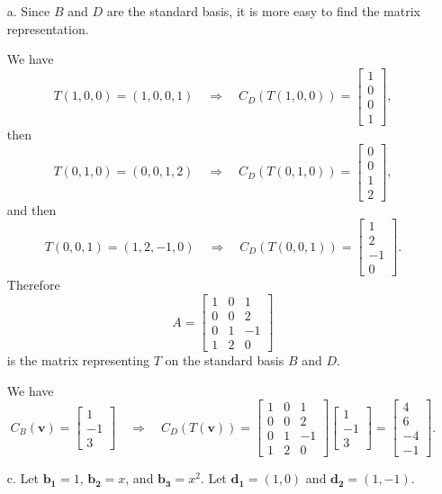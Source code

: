 \documentclass[12pt]{article}
\newcommand{\Ra}{\Rightarrow}
\begin{document}
	\begin{enumerate}
		\item[a.] Since $B$ and $D$ are the standard basis, it is more easy to find the matrix representation. 

		We have
			\[
				T (1, 0, 0) = (1, 0, 0, 1) \quad \Ra \quad C_D (T (1, 0, 0)) = \begin{bmatrix} 1 \\ 0 \\ 0 \\ 1 \end{bmatrix} ,
			\]
		then
			\[
				T (0, 1, 0) = (0, 0, 1, 2) \quad \Ra \quad C_D (T (0, 1, 0)) = \begin{bmatrix} 0 \\ 0 \\ 1 \\ 2 \end{bmatrix} ,
			\]
		and then
			\[
				T (0, 0, 1) = (1, 2, -1, 0) \quad \Ra \quad C_D (T (0, 0, 1)) = \begin{bmatrix} 1 \\ 2 \\ -1 \\ 0 \end{bmatrix} .
			\]
		Therefore
			\[
				A = \begin{bmatrix} 1 & 0 & 1 \\ 0 & 0 & 2 \\ 0 & 1 & -1 \\ 1 & 2 & 0 \end{bmatrix}
			\]
		is the matrix representing $T$ on the standard basis $B$ and $D$. 

		We have
			\[
				C_B (\mathbf{v}) = \begin{bmatrix} 1 \\ -1 \\ 3 \end{bmatrix} \quad \Ra \quad C_D (T (\mathbf{v})) = \begin{bmatrix} 1 & 0 & 1 \\ 0 & 0 & 2 \\ 0 & 1 & -1 \\ 1 & 2 & 0 \end{bmatrix} \begin{bmatrix} 1 \\ -1 \\ 3 \end{bmatrix} = \begin{bmatrix} 4 \\ 6 \\ -4 \\ -1 \end{bmatrix} .
			\]
		\item[c.] Let $\mathbf{b_1} = 1$, $\mathbf{b_2} = x$, and $\mathbf{b_3} = x^2$. Let $\mathbf{d_1} = (1, 0)$ and $\mathbf{d_2} = (1, -1)$.


\end{enumerate}
\end{document}
